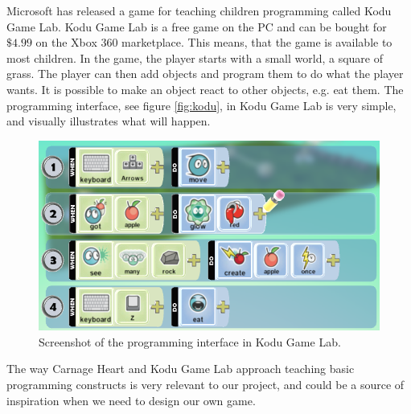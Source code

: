 Microsoft has released a game for teaching children programming called Kodu Game Lab. \cite{kodu} Kodu Game Lab is a free game on the PC and can be bought for $\$4.99$ on the Xbox 360 marketplace. This means, that the game is available to most children. In the game, the player starts with a small world, a square of grass. The player can then add objects and program them to do what the player wants. It is possible to make an object react to other objects, e.g. eat them. The programming interface, see figure \autoref{fig:kodu}, in Kodu Game Lab is very simple, and visually illustrates what will happen. 

\begin{figure}[h]
  \centering
    \includegraphics[width=\textwidth]{img/kodu.png}
  \caption{Screenshot of the programming interface in Kodu Game Lab.}
  \label{fig:kodu}
\end{figure}

The way Carnage Heart and Kodu Game Lab approach teaching basic programming constructs is very relevant to our project, and could be a source of inspiration when we need to design our own game.